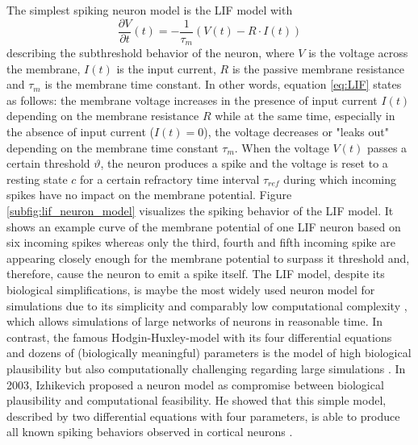 The simplest spiking neuron model is the \acf{LIF} model with
\begin{equation}
\frac{\partial V}{\partial t}(t) = - \frac{1}{\tau_{m}} \left( V\left(t\right) - R \cdot I\left(t\right) \right)
\label{eq:LIF}
\end{equation}
describing the subthreshold behavior of the neuron, where $V$ is the voltage across the membrane, $I(t)$ is the input current, $R$ is the passive membrane resistance and $\tau_{m}$ is the membrane time constant.
In other words, equation \ref{eq:LIF} states as follows: the membrane voltage increases in the presence of input current $I(t)$ depending on the membrane resistance $R$ while at the same time, especially in the absence of input current ($I(t)=0$), the voltage decreases or "leaks out" depending on the membrane time constant $\tau_{m}$.
When the voltage $V(t)$ passes a certain threshold $\vartheta$, the neuron produces a spike and the voltage is reset to a resting state $c$ for a certain refractory time interval $\tau_{ref}$ during which incoming spikes have no impact on the membrane potential.
Figure \ref{subfig:lif_neuron_model} visualizes the spiking behavior of the \ac{LIF} model.
It shows an example curve of the membrane potential of one \ac{LIF} neuron based on six incoming spikes whereas only the third, fourth and fifth incoming spike are appearing closely enough for the membrane potential to surpass it threshold and, therefore, cause the neuron to emit a spike itself.
The \ac{LIF} model, despite its biological simplifications, is maybe the most widely used neuron model for simulations due to its simplicity and comparably low computational complexity \cite{Izhikevich2004}, which allows simulations of large networks of neurons in reasonable time.
In contrast, the famous Hodgin-Huxley-model \cite{Hodgkin1952} with its four differential equations and dozens of (biologically meaningful) parameters is the model of high biological plausibility but also computationally challenging regarding large simulations \cite{Izhikevich2004}.
In 2003, Izhikevich proposed a neuron model \cite{Izhikevich2003} as compromise between biological plausibility and computational feasibility.
He showed that this simple model, described by two differential equations with four parameters, is able to produce all known spiking behaviors observed in cortical neurons \cite{Izhikevich2004}. 

